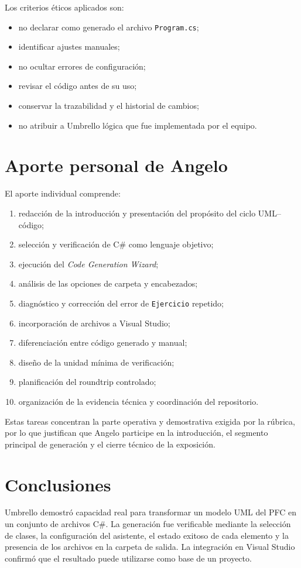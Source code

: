 Los criterios éticos aplicados son:
\begin{itemize}
  \item no declarar como generado el archivo \texttt{Program.cs};
  \item identificar ajustes manuales;
  \item no ocultar errores de configuración;
  \item revisar el código antes de su uso;
  \item conservar la trazabilidad y el historial de cambios;
  \item no atribuir a Umbrello lógica que fue implementada por el equipo.
\end{itemize}

\section{Aporte personal de Angelo}
El aporte individual comprende:
\begin{enumerate}
  \item redacción de la introducción y presentación del propósito del ciclo UML--código;
  \item selección y verificación de C\# como lenguaje objetivo;
  \item ejecución del \textit{Code Generation Wizard};
  \item análisis de las opciones de carpeta y encabezados;
  \item diagnóstico y corrección del error de \texttt{Ejercicio} repetido;
  \item incorporación de archivos a Visual Studio;
  \item diferenciación entre código generado y manual;
  \item diseño de la unidad mínima de verificación;
  \item planificación del roundtrip controlado;
  \item organización de la evidencia técnica y coordinación del repositorio.
\end{enumerate}

Estas tareas concentran la parte operativa y demostrativa exigida por la rúbrica, por lo que justifican que Angelo participe en la introducción, el segmento principal de generación y el cierre técnico de la exposición.

\section{Conclusiones}
Umbrello demostró capacidad real para transformar un modelo UML del PFC en un conjunto de archivos C\#. La generación fue verificable mediante la selección de clases, la configuración del asistente, el estado exitoso de cada elemento y la presencia de los archivos en la carpeta de salida. La integración en Visual Studio confirmó que el resultado puede utilizarse como base de un proyecto.

